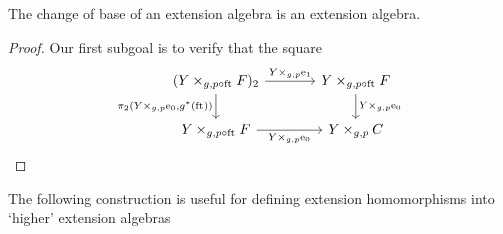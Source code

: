\begin{thm}\label{cobesys-ext}
The change of base of an extension algebra is an extension algebra.
\end{thm}

\begin{proof}
Our first subgoal is to verify that the square
\begin{equation*}
\begin{tikzcd}[column sep=large]
(\pullback{Y}{\stesysf}{g}{p\circ\eft})_2
  \ar{r}{\cobesys{Y}{\efamext}{g}{p}} 
  \ar{d}[swap]{\pullbackpr{2}{\cobesys{Y}{\ectxext}{g}{p}}{g^\ast(\eft)}} 
  & 
\pullback{Y}{\stesysf}{g}{p\circ\eft}
  \ar{d}{\cobesys{Y}{\ectxext}{g}{p}}
  \\
\pullback{Y}{\stesysf}{g}{p\circ\eft}
  \ar{r}[swap]{\cobesys{Y}{\ectxext}{g}{p}} 
  & 
\pullback{Y}{\stesysc}{g}{p}
\end{tikzcd}
\end{equation*}
\end{proof}

The following construction is useful for defining extension homomorphisms into
`higher' extension algebras

